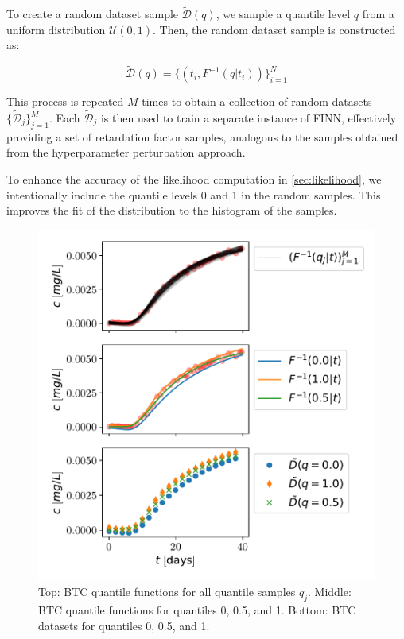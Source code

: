 To create a random dataset sample $\tilde{\mathcal{D}}(q)$, we sample a quantile level $q$ from a uniform distribution $\mathcal{U}(0, 1)$. Then, the random dataset sample is constructed as:

$$
\tilde{\mathcal{D}}(q) = \{ (t_i, F^{-1}(q | t_i) ) \}_{i=1}^N
$$

This process is repeated $M$ times to obtain a collection of random datasets $\{\tilde{\mathcal{D}}_j\}_{j=1}^M$. Each $\tilde{\mathcal{D}}_j$ is then used to train a separate instance of FINN, effectively providing a set of retardation factor samples, analogous to the samples obtained from the hyperparameter perturbation approach.

To enhance the accuracy of the likelihood computation in \cref{sec:likelihood}, we intentionally include the quantile levels 0 and 1 in the random samples. This improves the fit of the distribution to the histogram of the samples.

\begin{figure}[h]
    \centering
    \includegraphics{figs/btc_dataspan_quantiles.pdf}
    \caption{Top: BTC quantile functions for all quantile samples $q_j$. Middle: BTC quantile functions for quantiles 0, 0.5, and 1. Bottom: BTC datasets for quantiles 0, 0.5, and 1.}
    \label{fig:btc_dataspan_quantiles}
\end{figure}



